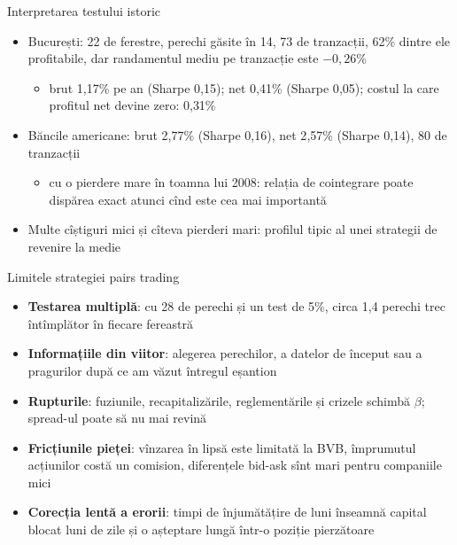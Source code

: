 \begin{frame}{Interpretarea testului istoric}
\itemsize{\small}
\begin{itemize}
    \item București: 22 de ferestre, perechi găsite în 14, 73 de tranzacții, 62\% dintre ele profitabile, dar randamentul mediu pe tranzacție este $-0{,}26$\%
    \begin{itemize}
        \item brut 1{,}17\% pe an (Sharpe 0{,}15); net 0{,}41\% (Sharpe 0{,}05); costul la care profitul net devine zero: 0{,}31\%
    \end{itemize}
    \item Băncile americane: brut 2{,}77\% (Sharpe 0{,}16), net 2{,}57\% (Sharpe 0{,}14), 80 de tranzacții
    \begin{itemize}
        \item cu o pierdere mare în toamna lui 2008: relația de cointegrare poate dispărea exact atunci cînd este cea mai importantă
    \end{itemize}
    \item Multe cîștiguri mici și cîteva pierderi mari: profilul tipic al unei strategii de revenire la medie
\end{itemize}
\end{frame}

\begin{frame}{Limitele strategiei pairs trading}
\itemsize{\small}
\begin{itemize}
    \item \textbf{Testarea multiplă}: cu 28 de perechi și un test de 5\%, circa 1{,}4 perechi trec întîmplător în fiecare fereastră
    \item \textbf{Informațiile din viitor}: alegerea perechilor, a datelor de început sau a pragurilor după ce am văzut întregul eșantion
    \item \textbf{Rupturile}: fuziunile, recapitalizările, reglementările și crizele schimbă $\beta$; spread-ul poate să nu mai revină
    \item \textbf{Fricțiunile pieței}: vînzarea în lipsă este limitată la BVB, împrumutul acțiunilor costă un comision, diferențele bid-ask sînt mari pentru companiile mici
    \item \textbf{Corecția lentă a erorii}: timpi de înjumătățire de luni înseamnă capital blocat luni de zile și o așteptare lungă într-o poziție pierzătoare
\end{itemize}
\end{frame}

